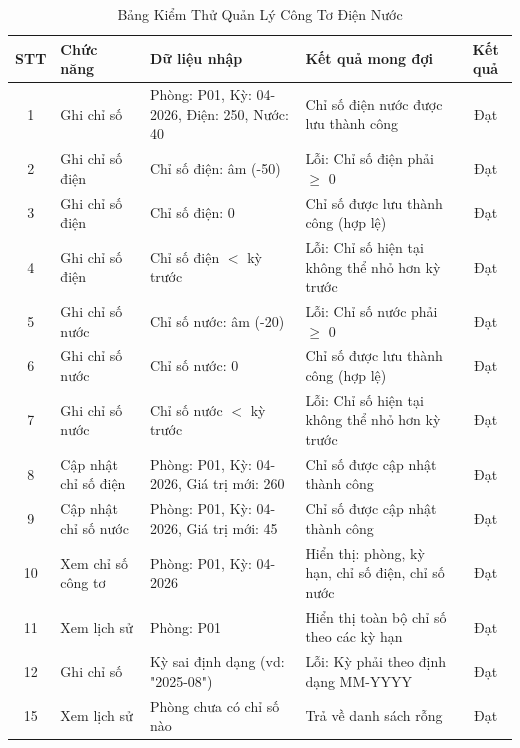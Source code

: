 \begin{table}[H]
    \centering
    \caption{Bảng Kiểm Thử Quản Lý Công Tơ Điện Nước}
    \label{tab:meter_management_test}
    \vspace{2mm}
    \begin{small}
    \begin{tabularx}{\textwidth}{|c|l|X|X|c|}
    \hline
    \textbf{STT} & \textbf{Chức năng} & \textbf{Dữ liệu nhập} & \textbf{Kết quả mong đợi} & \textbf{Kết quả} \\ \hline
    1 & Ghi chỉ số & Phòng: P01, Kỳ: 04-2026, Điện: 250, Nước: 40 & Chỉ số điện nước được lưu thành công & Đạt \\ \hline
    2 & Ghi chỉ số điện & Chỉ số điện: âm (-50) & Lỗi: Chỉ số điện phải $\ge$ 0 & Đạt \\ \hline
    3 & Ghi chỉ số điện & Chỉ số điện: 0 & Chỉ số được lưu thành công (hợp lệ) & Đạt \\ \hline
    4 & Ghi chỉ số điện & Chỉ số điện $<$ kỳ trước & Lỗi: Chỉ số hiện tại không thể nhỏ hơn kỳ trước & Đạt \\ \hline
    5 & Ghi chỉ số nước & Chỉ số nước: âm (-20) & Lỗi: Chỉ số nước phải $\ge$ 0 & Đạt \\ \hline
    6 & Ghi chỉ số nước & Chỉ số nước: 0 & Chỉ số được lưu thành công (hợp lệ) & Đạt \\ \hline
    7 & Ghi chỉ số nước & Chỉ số nước $<$ kỳ trước & Lỗi: Chỉ số hiện tại không thể nhỏ hơn kỳ trước & Đạt \\ \hline
    8 & Cập nhật chỉ số điện & Phòng: P01, Kỳ: 04-2026, Giá trị mới: 260 & Chỉ số được cập nhật thành công & Đạt \\ \hline
    9 & Cập nhật chỉ số nước & Phòng: P01, Kỳ: 04-2026, Giá trị mới: 45 & Chỉ số được cập nhật thành công & Đạt \\ \hline
    10 & Xem chỉ số công tơ & Phòng: P01, Kỳ: 04-2026 & Hiển thị: phòng, kỳ hạn, chỉ số điện, chỉ số nước & Đạt \\ \hline
    11 & Xem lịch sử & Phòng: P01 & Hiển thị toàn bộ chỉ số theo các kỳ hạn & Đạt \\ \hline
    12 & Ghi chỉ số & Kỳ sai định dạng (vd: "2025-08") & Lỗi: Kỳ phải theo định dạng MM-YYYY & Đạt \\ \hline
    15 & Xem lịch sử & Phòng chưa có chỉ số nào & Trả về danh sách rỗng & Đạt \\ \hline
    \end{tabularx}
    \end{small}
\end{table}

